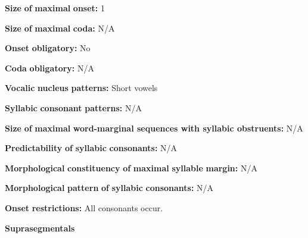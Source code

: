 \begin{styleBody}
\textbf{Size} \textbf{of} \textbf{maximal} \textbf{onset:} 1
\end{styleBody}

\begin{styleBody}
\textbf{Size} \textbf{of} \textbf{maximal} \textbf{coda:} N/A
\end{styleBody}

\begin{styleBody}
\textbf{Onset} \textbf{obligatory:} No
\end{styleBody}

\begin{styleBody}
\textbf{Coda} \textbf{obligatory:} N/A
\end{styleBody}

\begin{styleBody}
\textbf{Vocalic} \textbf{nucleus} \textbf{patterns:} Short vowels
\end{styleBody}

\begin{styleBody}
\textbf{Syllabic} \textbf{consonant} \textbf{patterns:} N/A
\end{styleBody}

\begin{styleBody}
\textbf{Size} \textbf{of} \textbf{maximal} \textbf{word{}-marginal sequences with syllabic obstruents:} N/A
\end{styleBody}

\begin{styleBody}
\textbf{Predictability} \textbf{of} \textbf{syllabic} \textbf{consonants:} N/A
\end{styleBody}

\begin{styleBody}
\textbf{Morphological} \textbf{constituency} \textbf{of} \textbf{maximal} \textbf{syllable} \textbf{margin:} N/A
\end{styleBody}

\begin{styleBody}
\textbf{Morphological} \textbf{pattern} \textbf{of} \textbf{syllabic} \textbf{consonants:} N/A
\end{styleBody}

\begin{styleBody}
\textbf{Onset} \textbf{restrictions:} All consonants occur.
\end{styleBody}

\begin{styleBody}
\textbf{Suprasegmentals}
\end{styleBody}

